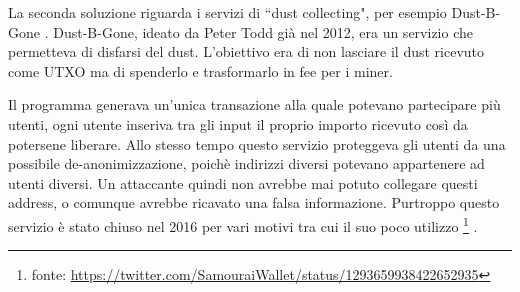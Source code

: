 La seconda soluzione riguarda i servizi di ``dust collecting", per esempio Dust-B-Gone \cite{Dbg}.
Dust-B-Gone, ideato da Peter Todd già nel 2012, era un servizio che permetteva di disfarsi del dust. L'obiettivo era di non lasciare il dust ricevuto come UTXO ma di spenderlo e trasformarlo in fee per i miner.

Il programma generava un'unica transazione alla quale potevano partecipare più utenti, ogni utente inseriva tra gli input il proprio importo ricevuto così da potersene liberare. Allo stesso tempo questo servizio proteggeva gli utenti da una possibile de-anonimizzazione, poichè indirizzi diversi potevano appartenere ad utenti diversi. Un attaccante quindi non avrebbe mai potuto collegare questi address, o comunque avrebbe ricavato una falsa informazione.
Purtroppo questo servizio è stato chiuso nel 2016 per vari motivi tra cui il suo poco utilizzo \footnote{fonte: \url{https://twitter.com/SamouraiWallet/status/1293659938422652935}} . 